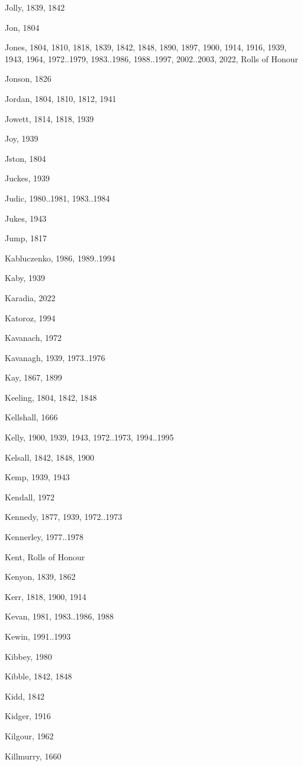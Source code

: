 \begin{theindex}
\item Jolly, 1839, 1842
\item Jon, 1804
\item Jones, 1804, 1810, 1818, 1839, 1842, 1848, 1890, 1897, 1900, 1914, 1916, 1939, 1943, 1964, 1972..1979, 1983..1986, 1988..1997, 2002..2003, 2022, Rolls of Honour
\item Jonson, 1826
\item Jordan, 1804, 1810, 1812, 1941
\item Jowett, 1814, 1818, 1939
\item Joy, 1939
\item Jston, 1804
\item Juckes, 1939
\item Judic, 1980..1981, 1983..1984
\item Jukes, 1943
\item Jump, 1817
\item Kabluczenko, 1986, 1989..1994
\item Kaby, 1939
\item Karadia, 2022
\item Katoroz, 1994
\item Kavanach, 1972
\item Kavanagh, 1939, 1973..1976
\item Kay, 1867, 1899
\item Keeling, 1804, 1842, 1848
\item Kellshall, 1666
\item Kelly, 1900, 1939, 1943, 1972..1973, 1994..1995
\item Kelsall, 1842, 1848, 1900
\item Kemp, 1939, 1943
\item Kendall, 1972
\item Kennedy, 1877, 1939, 1972..1973
\item Kennerley, 1977..1978
\item Kent, Rolls of Honour
\item Kenyon, 1839, 1862
\item Kerr, 1818, 1900, 1914
\item Kevan, 1981, 1983..1986, 1988
\item Kewin, 1991..1993
\item Kibbey, 1980
\item Kibble, 1842, 1848
\item Kidd, 1842
\item Kidger, 1916
\item Kilgour, 1962
\item Killmurry, 1660

\end{theindex}
